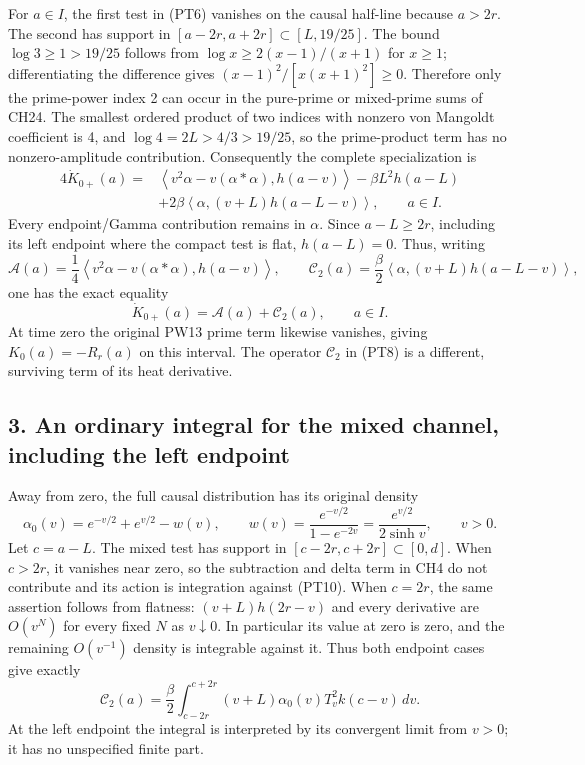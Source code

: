 \documentclass[
  10pt,
  a4paper,
]{article}
\begin{document}
For \(a\in I\), the first test in (PT6) vanishes on the causal half-line
because \(a>2r\). The second has support in
\([a-2r,a+2r]\subset[L,19/25]\). The bound \(\log3\ge1>19/25\) follows
from \(\log x\ge2(x-1)/(x+1)\) for \(x\ge1\); differentiating the
difference gives \((x-1)^2/[x(x+1)^2]\ge0\). Therefore only the
prime-power index 2 can occur in the pure-prime or mixed-prime sums of
CH24. The smallest ordered product of two indices with nonzero von
Mangoldt coefficient is 4, and \(\log4=2L>4/3>19/25\), so the
prime-product term has no nonzero-amplitude contribution. Consequently
the complete specialization is \[
\begin{aligned}
4\dot K_{0+}(a)={}&
\left\langle v^2\alpha-v(\alpha*\alpha),h(a-v)\right\rangle
-\beta L^2h(a-L)\\
&+2\beta\left\langle\alpha,(v+L)h(a-L-v)\right\rangle,
\qquad a\in I.
\end{aligned}
\tag{PT7}
\] Every endpoint/Gamma contribution remains in \(\alpha\). Since
\(a-L\ge2r\), including its left endpoint where the compact test is
flat, \(h(a-L)=0\). Thus, writing \[
\mathcal A(a)=\frac14\left\langle v^2\alpha-v(\alpha*\alpha),h(a-v)\right\rangle,
\qquad
\mathcal C_2(a)=\frac\beta2\left\langle\alpha,(v+L)h(a-L-v)\right\rangle,
\tag{PT8}
\] one has the exact equality \[
\boxed{\dot K_{0+}(a)=\mathcal A(a)+\mathcal C_2(a),\qquad a\in I.}
\tag{PT9}
\] At time zero the original PW13 prime term likewise vanishes, giving
\(K_0(a)=-R_r(a)\) on this interval. The operator \(\mathcal C_2\) in
(PT8) is a different, surviving term of its heat derivative.

\subsection{3. An ordinary integral for the mixed channel, including the
left
endpoint}\label{an-ordinary-integral-for-the-mixed-channel-including-the-left-endpoint}

Away from zero, the full causal distribution has its original density \[
\alpha_0(v)=e^{-v/2}+e^{v/2}-w(v),\qquad
w(v)=\frac{e^{-v/2}}{1-e^{-2v}}=\frac{e^{v/2}}{2\sinh v},\qquad v>0.
\tag{PT10}
\] Let \(c=a-L\). The mixed test has support in
\([c-2r,c+2r]\subset[0,d]\). When \(c>2r\), it vanishes near zero, so
the subtraction and delta term in CH4 do not contribute and its action
is integration against (PT10). When \(c=2r\), the same assertion follows
from flatness: \((v+L)h(2r-v)\) and every derivative are \(O(v^N)\) for
every fixed \(N\) as \(v\downarrow0\). In particular its value at zero
is zero, and the remaining \(O(v^{-1})\) density is integrable against
it. Thus both endpoint cases give exactly \[
\mathcal C_2(a)=\frac\beta2\int_{c-2r}^{c+2r}
(v+L)\alpha_0(v)T_v^2k(c-v)\,dv.
\tag{PT11}
\] At the left endpoint the integral is interpreted by its convergent
limit from \(v>0\); it has no unspecified finite part.
\end{document}
